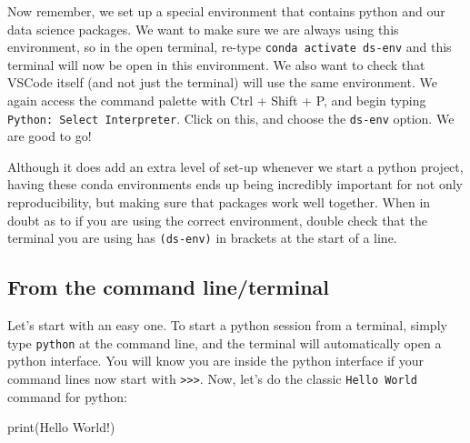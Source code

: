\documentclass[
  letterpaper,
  DIV=11,
  numbers=noendperiod]{scrreprt}
\newenvironment{Shaded}{\begin{snugshade}}{\end{snugshade}}
\newcommand{\BuiltInTok}[1]{\textcolor[rgb]{0.00,0.23,0.31}{#1}}
\newcommand{\NormalTok}[1]{\textcolor[rgb]{0.00,0.23,0.31}{#1}}
\newcommand{\StringTok}[1]{\textcolor[rgb]{0.13,0.47,0.30}{#1}}
\begin{document}
Now remember, we set up a special environment that contains python and
our data science packages. We want to make sure we are always using this
environment, so in the open terminal, re-type
\texttt{conda\ activate\ ds-env} and this terminal will now be open in
this environment. We also want to check that VSCode itself (and not just
the terminal) will use the same environment. We again access the command
palette with Ctrl + Shift + P, and begin typing
\texttt{Python:\ Select\ Interpreter}. Click on this, and choose the
\texttt{ds-env} option. We are good to go!

\begin{tcolorbox}[enhanced jigsaw, rightrule=.15mm, opacitybacktitle=0.6, colback=white, toprule=.15mm, colframe=quarto-callout-tip-color-frame, bottomtitle=1mm, bottomrule=.15mm, arc=.35mm, coltitle=black, breakable, title=\textcolor{quarto-callout-tip-color}{\faLightbulb}\hspace{0.5em}{Conda Environments}, titlerule=0mm, opacityback=0, colbacktitle=quarto-callout-tip-color!10!white, left=2mm, toptitle=1mm, leftrule=.75mm]
Although it does add an extra level of set-up whenever we start a python
project, having these conda environments ends up being incredibly
important for not only reproducibility, but making sure that packages
work well together. When in doubt as to if you are using the correct
environment, double check that the terminal you are using has
\texttt{(ds-env)} in brackets at the start of a line.
\end{tcolorbox}

\hypertarget{from-the-command-lineterminal}{%
\subsection{From the command
line/terminal}\label{from-the-command-lineterminal}}

Let's start with an easy one. To start a python session from a terminal,
simply type \texttt{python} at the command line, and the terminal will
automatically open a python interface. You will know you are inside the
python interface if your command lines now start with
\texttt{\textgreater{}\textgreater{}\textgreater{}}. Now, let's do the
classic \texttt{Hello\ World} command for python:

\begin{Shaded}
\begin{Highlighting}[]
\BuiltInTok{print}\NormalTok{(}\StringTok{\textquotesingle{}Hello World!\textquotesingle{}}\NormalTok{)}
\end{Highlighting}
\end{Shaded}
\end{document}
